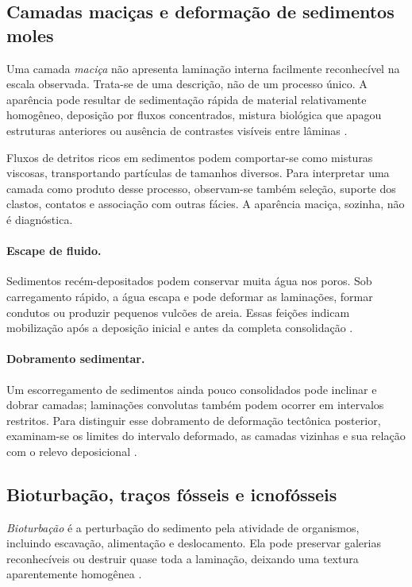 \subsection{Camadas maciças e deformação de sedimentos moles}

Uma camada \emph{maciça} não apresenta laminação interna facilmente
reconhecível na escala observada. Trata-se de uma descrição, não de um
processo único. A aparência pode resultar de sedimentação rápida de
material relativamente homogêneo, deposição por fluxos concentrados,
mistura biológica que apagou estruturas anteriores ou ausência de
contrastes visíveis entre lâminas \autocite{iodpestrutura,iodpbioturbacao}.

Fluxos de detritos ricos em sedimentos podem comportar-se como misturas
viscosas, transportando partículas de tamanhos diversos. Para interpretar
uma camada como produto desse processo, observam-se também seleção,
suporte dos clastos, contatos e associação com outras fácies. A aparência
maciça, sozinha, não é diagnóstica.

\paragraph{Escape de fluido.}
Sedimentos recém-depositados podem conservar muita água nos poros.
Sob carregamento rápido, a água escapa e pode deformar as laminações,
formar condutos ou produzir pequenos vulcões de areia. Essas feições
indicam mobilização após a deposição inicial e antes da completa
consolidação \autocite{kgsheterolitica}.

\paragraph{Dobramento sedimentar.}
Um escorregamento de sedimentos ainda pouco consolidados pode inclinar
e dobrar camadas; laminações convolutas também podem ocorrer em intervalos
restritos. Para distinguir esse dobramento de deformação tectônica
posterior, examinam-se os limites do intervalo deformado, as camadas
vizinhas e sua relação com o relevo deposicional
\autocite{kgsheterolitica}.

\subsection{Bioturbação, traços fósseis e icnofósseis}

\emph{Bioturbação} é a perturbação do sedimento pela atividade de
organismos, incluindo escavação, alimentação e deslocamento. Ela pode
preservar galerias reconhecíveis ou destruir quase toda a laminação,
deixando uma textura aparentemente homogênea \autocite{iodpbioturbacao}.

